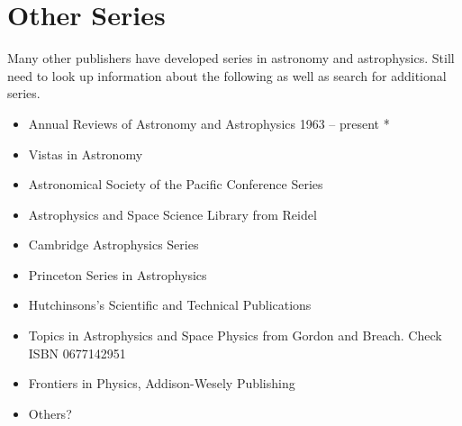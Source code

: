 \section{Other Series}

Many other publishers have developed series in astronomy and
astrophysics.  Still need to look up information about the following
as well as search for additional series.

\begin{itemize}
  \item Annual Reviews of Astronomy and Astrophysics 1963 -- present *
  \item Vistas in Astronomy
  \item Astronomical Society of the Pacific Conference Series
  \item Astrophysics and Space Science Library from Reidel
  \item Cambridge Astrophysics Series
  \item Princeton Series in Astrophysics
  \item Hutchinsons's Scientific and Technical Publications
  \item Topics in Astrophysics and Space Physics from Gordon and Breach. Check ISBN 0677142951
  \item Frontiers in Physics, Addison-Wesely Publishing    
  \item Others?
\end{itemize}
